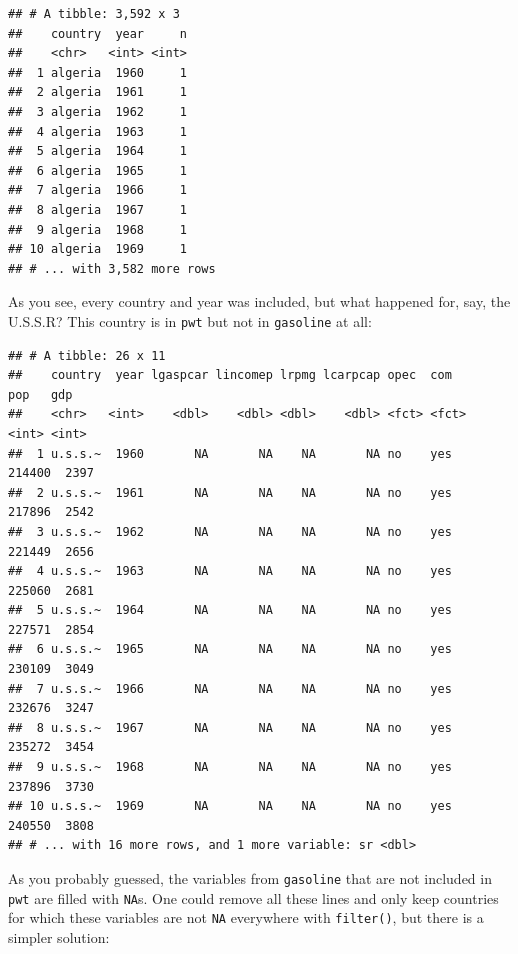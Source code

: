 \documentclass[]{gitbook}
\newenvironment{Shaded}{\begin{snugshade}}{\end{snugshade}}
\newcommand{\KeywordTok}[1]{\textcolor[rgb]{0.13,0.29,0.53}{\textbf{#1}}}
\newcommand{\NormalTok}[1]{#1}
\newcommand{\OperatorTok}[1]{\textcolor[rgb]{0.81,0.36,0.00}{\textbf{#1}}}
\newcommand{\StringTok}[1]{\textcolor[rgb]{0.31,0.60,0.02}{#1}}
\begin{document}
\begin{verbatim}
## # A tibble: 3,592 x 3
##    country  year     n
##    <chr>   <int> <int>
##  1 algeria  1960     1
##  2 algeria  1961     1
##  3 algeria  1962     1
##  4 algeria  1963     1
##  5 algeria  1964     1
##  6 algeria  1965     1
##  7 algeria  1966     1
##  8 algeria  1967     1
##  9 algeria  1968     1
## 10 algeria  1969     1
## # ... with 3,582 more rows
\end{verbatim}

As you see, every country and year was included, but what happened for, say, the U.S.S.R? This country
is in \texttt{pwt} but not in \texttt{gasoline} at all:

\begin{Shaded}
\end{Shaded}

\begin{verbatim}
## # A tibble: 26 x 11
##    country  year lgaspcar lincomep lrpmg lcarpcap opec  com      pop   gdp
##    <chr>   <int>    <dbl>    <dbl> <dbl>    <dbl> <fct> <fct>  <int> <int>
##  1 u.s.s.~  1960       NA       NA    NA       NA no    yes   214400  2397
##  2 u.s.s.~  1961       NA       NA    NA       NA no    yes   217896  2542
##  3 u.s.s.~  1962       NA       NA    NA       NA no    yes   221449  2656
##  4 u.s.s.~  1963       NA       NA    NA       NA no    yes   225060  2681
##  5 u.s.s.~  1964       NA       NA    NA       NA no    yes   227571  2854
##  6 u.s.s.~  1965       NA       NA    NA       NA no    yes   230109  3049
##  7 u.s.s.~  1966       NA       NA    NA       NA no    yes   232676  3247
##  8 u.s.s.~  1967       NA       NA    NA       NA no    yes   235272  3454
##  9 u.s.s.~  1968       NA       NA    NA       NA no    yes   237896  3730
## 10 u.s.s.~  1969       NA       NA    NA       NA no    yes   240550  3808
## # ... with 16 more rows, and 1 more variable: sr <dbl>
\end{verbatim}

As you probably guessed, the variables from \texttt{gasoline} that are not included in \texttt{pwt} are filled with
\texttt{NA}s. One could remove all these lines and only keep countries for which these variables are not
\texttt{NA} everywhere with \texttt{filter()}, but there is a simpler solution:
\end{document}
